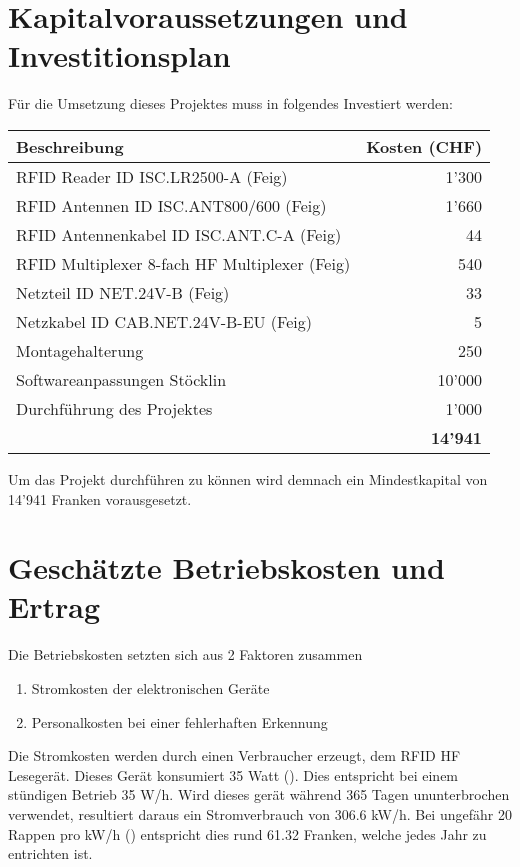 \chapter{Kapitalvoraussetzungen und Investitionsplan}
Für die Umsetzung dieses Projektes muss in folgendes Investiert werden:

\vspace{1em}

\begin{tabularx}{\textwidth}{|X|r|}
	\hline
	\textbf{Beschreibung} & \textbf{Kosten (CHF)} \\
	\hline
	RFID Reader ID ISC.LR2500-A (Feig) & 1'300 \\
	\hline
	RFID Antennen ID ISC.ANT800/600 (Feig)& 1'660 \\
	\hline
	RFID Antennenkabel ID ISC.ANT.C-A (Feig) & 44 \\
	\hline
	RFID Multiplexer 8-fach HF Multiplexer (Feig) & 540 \\
	\hline
	Netzteil ID NET.24V-B (Feig) & 33 \\
	\hline
	Netzkabel ID CAB.NET.24V-B-EU (Feig) & 5 \\
	\hline
	Montagehalterung & 250 \\
	\hline
	Softwareanpassungen Stöcklin & 10'000 \\
	\hline
	Durchführung des Projektes & 1'000 \\
	\hline
	\hline
	 & \textbf{14'941} \\
	 \hline
\end{tabularx}

\vspace{1em}

Um das Projekt durchführen zu können wird demnach ein Mindestkapital von 14'941 Franken vorausgesetzt.

\chapter{Geschätzte Betriebskosten und Ertrag}
Die Betriebskosten setzten sich aus 2 Faktoren zusammen
\begin{enumerate}
	\item Stromkosten der elektronischen Geräte
	\item Personalkosten bei einer fehlerhaften Erkennung
\end{enumerate}

Die Stromkosten werden durch einen Verbraucher erzeugt, dem RFID HF Lesegerät. Dieses Gerät konsumiert 35 Watt (\cite{DatenblattRFIDReader}). Dies entspricht bei einem stündigen Betrieb 35 W/h. Wird dieses gerät während 365 Tagen ununterbrochen verwendet, resultiert daraus ein Stromverbrauch von 306.6 kW/h. Bei ungefähr 20 Rappen pro kW/h (\cite{StromPreisAdmin2019}) entspricht dies rund 61.32 Franken, welche jedes Jahr zu entrichten ist.

